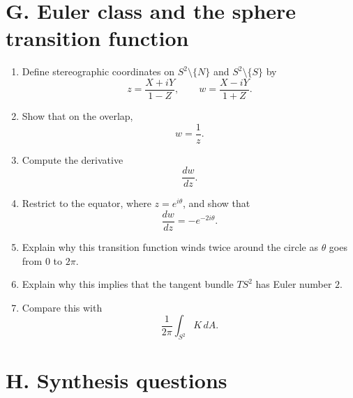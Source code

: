 \documentclass[11pt]{article}
\begin{document}
	\section*{G. Euler class and the sphere transition function}
	
	\begin{enumerate}[leftmargin=2em,label=\textbf{G\arabic*.}]
		\item Define stereographic coordinates on \(S^2\setminus\{N\}\) and \(S^2\setminus\{S\}\) by
		\[
		z=\frac{X+iY}{1-Z},
		\qquad
		w=\frac{X-iY}{1+Z}.
		\]
		
		\item Show that on the overlap,
		\[
		w=\frac{1}{z}.
		\]
		
		\item Compute the derivative
		\[
		\frac{dw}{dz}.
		\]
		
		\item Restrict to the equator, where \(z=e^{i\theta}\), and show that
		\[
		\frac{dw}{dz}=-e^{-2i\theta}.
		\]
		
		\item Explain why this transition function winds twice around the circle as \(\theta\) goes from \(0\) to \(2\pi\).
		
		\item Explain why this implies that the tangent bundle \(TS^2\) has Euler number \(2\).
		
		\item Compare this with
		\[
		\frac{1}{2\pi}\int_{S^2}K\,dA.
		\]
	\end{enumerate}
	
	\section*{H. Synthesis questions}
	
\end{document}
